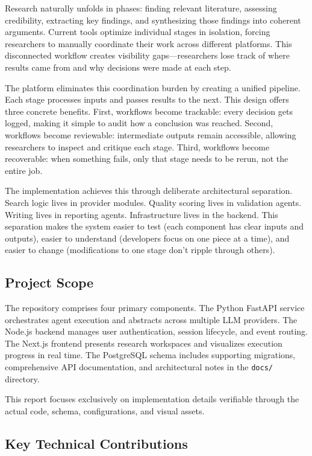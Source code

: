 \documentclass[12pt, a4paper]{article}
\begin{document}
Research naturally unfolds in phases: finding relevant literature, assessing credibility, extracting key findings, and synthesizing those findings into coherent arguments. Current tools optimize individual stages in isolation, forcing researchers to manually coordinate their work across different platforms. This disconnected workflow creates visibility gaps—researchers lose track of where results came from and why decisions were made at each step.

The platform eliminates this coordination burden by creating a unified pipeline. Each stage processes inputs and passes results to the next. This design offers three concrete benefits. First, workflows become trackable: every decision gets logged, making it simple to audit how a conclusion was reached. Second, workflows become reviewable: intermediate outputs remain accessible, allowing researchers to inspect and critique each stage. Third, workflows become recoverable: when something fails, only that stage needs to be rerun, not the entire job.

The implementation achieves this through deliberate architectural separation. Search logic lives in provider modules. Quality scoring lives in validation agents. Writing lives in reporting agents. Infrastructure lives in the backend. This separation makes the system easier to test (each component has clear inputs and outputs), easier to understand (developers focus on one piece at a time), and easier to change (modifications to one stage don't ripple through others).

\subsection{Project Scope}

The repository comprises four primary components. The Python FastAPI service orchestrates agent execution and abstracts across multiple LLM providers. The Node.js backend manages user authentication, session lifecycle, and event routing. The Next.js frontend presents research workspaces and visualizes execution progress in real time. The PostgreSQL schema includes supporting migrations, comprehensive API documentation, and architectural notes in the \texttt{docs/} directory.

This report focuses exclusively on implementation details verifiable through the actual code, schema, configurations, and visual assets.

\subsection{Key Technical Contributions}
\end{document}
